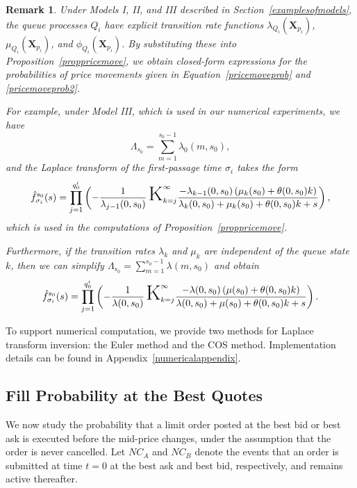 \documentclass[11pt]{article}
\newtheorem{remark}{Remark}
\begin{document}
\begin{remark}\label{remark-birth-death}
Under Models I, II, and III described in Section~\ref{examplesofmodels}, the queue processes $Q_i$ have explicit transition rate functions $\lambda_{Q_i}(\boldsymbol{X}_{p_i})$, $\mu_{Q_i}(\boldsymbol{X}_{p_i})$, and $\phi_{Q_i}(\boldsymbol{X}_{p_i})$. By substituting these into Proposition~\ref{proppricemove}, we obtain closed-form expressions for the probabilities of price movements given in Equation~\eqref{pricemoveprob} and \eqref{pricemoveprob2}.

For example, under Model III, which is used in our numerical experiments, we have
\[
\Lambda_{s_0} = \sum_{m=1}^{s_0 - 1} \lambda_0(m, s_0),
\]
and the Laplace transform of the first-passage time $\sigma_i$ takes the form
\begin{equation}\label{FPTtransformmodel3}
    \hat{f}^{s_0}_{\sigma_i}(s) = \prod_{j=1}^{q^i_0} \left( -\frac{1}{\lambda_{j-1}(0, s_0)} \, \text{\textup{\huge K}}_{k=j}^\infty \frac{-\lambda_{k-1}(0, s_0) \left( \mu_k(s_0) +  \theta(0, s_0) k \right)}{\lambda_k(0, s_0) + \mu_k(s_0) + \theta(0, s_0) k + s} \right),
\end{equation}
which is used in the computations of Proposition~\ref{proppricemove}.

Furthermore, if the transition rates $\lambda_k$ and $\mu_k$ are independent of the queue state $k$, then we can simplify $\Lambda_{s_0} = \sum_{m=1}^{s_0 - 1} \lambda(m, s_0)$ and obtain
\begin{equation}\label{FPTtransformmodel3simple}
    \hat{f}^{s_0}_{\sigma_i}(s) = \prod_{j=1}^{q^i_0} \left( -\frac{1}{\lambda(0, s_0)} \, \text{\textup{\huge K}}_{k=j}^\infty \frac{-\lambda(0, s_0) \left( \mu(s_0) + \theta(0, s_0) k \right)}{\lambda(0, s_0) + \mu(s_0) + \theta(0, s_0) k + s} \right).
\end{equation}
\end{remark}

To support numerical computation, we provide two methods for Laplace transform inversion: the Euler method and the COS method. Implementation details can be found in Appendix~\ref{numericalappendix}.

\subsection{Fill Probability at the Best Quotes}\label{sec: fill_prob_best_p}

We now study the probability that a limit order posted at the best bid or best ask is executed before the mid-price changes, under the assumption that the order is never cancelled. Let $NC_A$ and $NC_B$ denote the events that an order is submitted at time $t=0$ at the best ask and best bid, respectively, and remains active thereafter.
\end{document}
